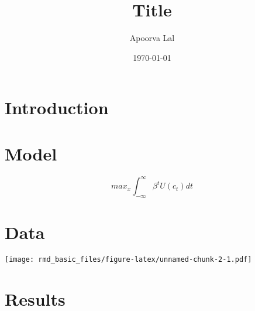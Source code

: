 \documentclass[12pt,]{article}
\title{Title}
\author{Apoorva Lal}
\date{\today}
\begin{document}
\maketitle

\section{Introduction}\label{introduction}

\section{Model}\label{model}

\[
max_{x} \int_{-\infty}^{\infty} \beta^t U(c_t) dt
\]

\section{Data}\label{data}

\texttt{[image: rmd\_basic\_files/figure-latex/unnamed-chunk-2-1.pdf]}

\section{Results}\label{results}
\end{document}
